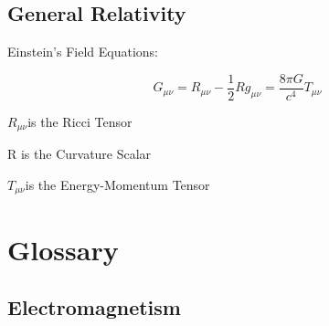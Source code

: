 \documentclass[english]{book}
\begin{document}
\section{General Relativity}

Einstein's Field Equations:

\[
G_{\mu\nu}=R_{\mu\nu}-\frac{1}{2}Rg_{\mu\nu}=\frac{8\pi G}{c^{4}}T_{\mu\nu}
\]

$R_{\mu\nu}$is the Ricci Tensor

R is the Curvature Scalar

$T_{\mu\nu}$is the Energy-Momentum Tensor





\chapter{Glossary}

\section{Electromagnetism}
\end{document}
